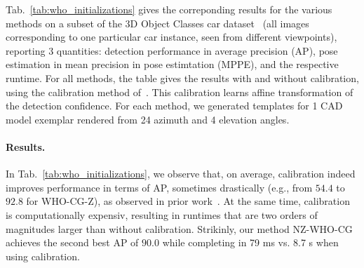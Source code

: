 Tab.~\ref{tab:who_initializations} gives the correponding results for
the various methods on a subset of the 3D Object Classes car
dataset~\cite{Savarese07} (all images corresponding to one particular
car instance, seen from different viewpoints), reporting 3 quantities:
detection performance in average precision (AP), pose estimation in mean
precision in pose estimtation (MPPE), and the respective runtime.
%
For all methods, the table gives the results with and without
calibration, using the calibration method of~\cite{Aubry14}. This
calibration learns affine transformation of the detection confidence.
For each method, we generated templates for 1 CAD model exemplar
rendered from 24 azimuth and 4 elevation angles.

\paragraph{Results.}
In Tab.~\ref{tab:who_initializations}, we observe that, on average,
calibration indeed improves performance in terms of AP, sometimes
drastically (e.g., from $54.4$ to $92.8$ for WHO-CG-Z), as observed in
prior work~\cite{Aubry14}. At the same time, calibration is
computationally expensiv, resulting in runtimes that are two orders of
magnitudes larger than without calibration. Strikinly, our method
NZ-WHO-CG achieves the second best AP of $90.0$ while completing in 79
ms vs. 8.7 s when using calibration.



